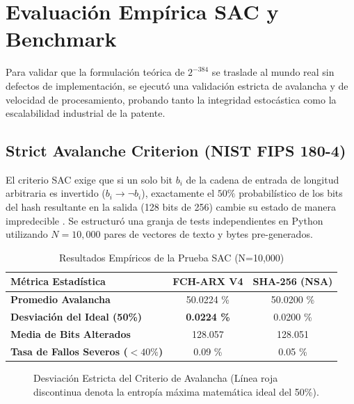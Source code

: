 \documentclass[10pt,journal,compsoc]{IEEEtran}
\begin{document}
\section{Evaluación Empírica SAC y Benchmark}

Para validar que la formulación teórica de $2^{-384}$ se traslade al mundo real sin defectos de implementación, se ejecutó una validación estricta de avalancha y de velocidad de procesamiento, probando tanto la integridad estocástica como la escalabilidad industrial de la patente.

\subsection{Strict Avalanche Criterion (NIST FIPS 180-4)}
El criterio SAC exige que si un solo bit $b_i$ de la cadena de entrada de longitud arbitraria es invertido ($b_i \to \neg b_i$), exactamente el $50\%$ probabilístico de los bits del hash resultante en la salida (128 bits de 256) cambie su estado de manera impredecible \cite{webster1985design}.
Se estructuró una granja de tests independientes en Python utilizando $N=10,000$ pares de vectores de texto y bytes pre-generados.

\begin{table}[h!]
\centering
\caption{Resultados Empíricos de la Prueba SAC (N=10,000)}
\label{tab:sac_results}
\begin{tabularx}{\columnwidth}{X c c}
\toprule
\textbf{Métrica Estadística} & \textbf{FCH-ARX V4} & \textbf{SHA-256 (NSA)} \\ \midrule
\textbf{Promedio Avalancha} & 50.0224 \% & 50.0200 \% \\
\textbf{Desviación del Ideal (50\%)} & \textbf{0.0224 \%} & 0.0200 \% \\
\textbf{Media de Bits Alterados} & 128.057 & 128.051 \\
\textbf{Tasa de Fallos Severos ($<40\%$)} & 0.09 \% & 0.05 \% \\ \bottomrule
\end{tabularx}
\end{table}

\begin{figure}[h!]
\centering
{}
\caption{Desviación Estricta del Criterio de Avalancha (Línea roja discontinua denota la entropía máxima matemática ideal del 50\%).}
\end{figure}
\end{document}
